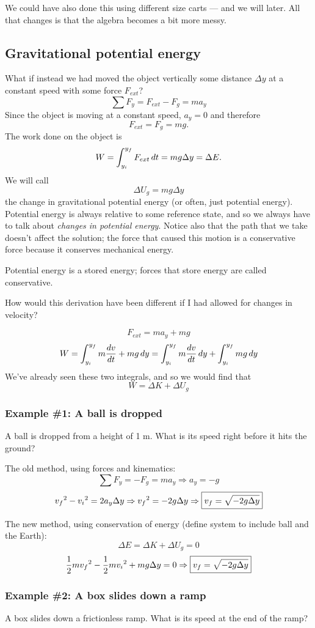 We could have also done this using different size carts --- and we will later. All that changes is that the algebra becomes a bit more messy.

\subsection{Gravitational potential energy}
What if instead we had moved the object vertically some distance $\Delta y$ at a constant speed with some force $F_{ext}$?
$$\sum F_y=F_{ext}-F_g=ma_y$$
Since the object is moving at a constant speed, $a_y=0$ and therefore
$$F_{ext}=F_g=mg.$$
The work done on the object is
$$W=\displaystyle\int_{y_i}^{y_f}F_{ext}\,dt=mg\Delta{y}=\Delta{E}.$$
We will call
$$\boxed{\Delta{U_g}=mg\Delta{y}}$$
the change in gravitational potential energy (or often, just potential energy). Potential energy is always relative to some reference state, and so we always have to talk about \textit{changes in potential energy}. Notice also that the path that we take doesn't affect the solution; the force that caused this motion is a conservative force because it conserves mechanical energy.

Potential energy is a stored energy; forces that store energy are called conservative.

How would this derivation have been different if I had allowed for changes in velocity?

$$F_{ext}=ma_y+mg$$
$$W=\displaystyle\int_{y_i}^{y_f}m\frac{dv}{dt}+mg\,dy=\displaystyle\int_{y_i}^{y_f}m\frac{dv}{dt}\,dy+\int_{y_i}^{y_f}mg\,dy$$
We've already seen these two integrals, and so we would find that
$$W=\Delta K + \Delta U_g$$


\subsubsection{Example \#1: A ball is dropped}
A ball is dropped from a height of 1 m. What is its speed right before it hits the ground?

The old method, using forces and kinematics:
$$\sum F_y=-F_g=ma_y\Rightarrow a_y=-g$$
$$v_f\displaystyle^2-v_i\displaystyle^2=2a_y\Delta{y}\Rightarrow v_f\displaystyle^2=-2g\Delta{y}\Rightarrow \boxed{v_f=\sqrt{-2g\Delta{y}}}$$

The new method, using conservation of energy (define system to include ball and the Earth):
$$\Delta{E}=\Delta{K}+\Delta{U_g}=0$$
$$\frac{1}{2}mv_f\displaystyle^2-\frac{1}{2}mv_i\displaystyle^2+mg\Delta{y}=0\Rightarrow \boxed{v_f=\sqrt{-2g\Delta{y}}}$$

\subsubsection{Example \#2: A box slides down a ramp}
A box slides down a frictionless ramp. What is its speed at the end of the ramp?

